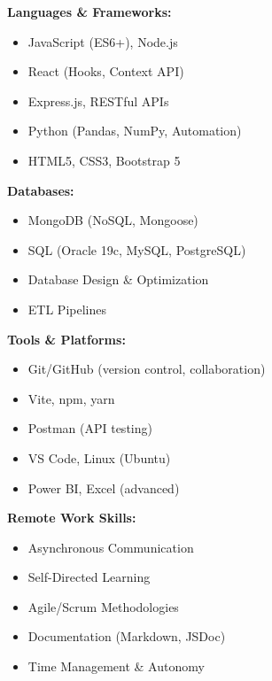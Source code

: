 \documentclass[10pt,letterpaper]{article}
\begin{document}
\vspace{0.4cm}

\vspace{0.3cm}

\noindent
\begin{minipage}[t]{0.48\textwidth}
\textbf{Languages \& Frameworks:}
\begin{itemize}
    \item JavaScript (ES6+), Node.js
    \item React (Hooks, Context API)
    \item Express.js, RESTful APIs
    \item Python (Pandas, NumPy, Automation)
    \item HTML5, CSS3, Bootstrap 5
\end{itemize}

\vspace{0.2cm}

\textbf{Databases:}
\begin{itemize}
    \item MongoDB (NoSQL, Mongoose)
    \item SQL (Oracle 19c, MySQL, PostgreSQL)
    \item Database Design \& Optimization
    \item ETL Pipelines
\end{itemize}
\end{minipage}
\hfill
\begin{minipage}[t]{0.48\textwidth}
\textbf{Tools \& Platforms:}
\begin{itemize}
    \item Git/GitHub (version control, collaboration)
    \item Vite, npm, yarn
    \item Postman (API testing)
    \item VS Code, Linux (Ubuntu)
    \item Power BI, Excel (advanced)
\end{itemize}

\vspace{0.2cm}

\textbf{Remote Work Skills:}
\begin{itemize}
    \item Asynchronous Communication
    \item Self-Directed Learning
    \item Agile/Scrum Methodologies
    \item Documentation (Markdown, JSDoc)
    \item Time Management \& Autonomy
\end{itemize}
\end{minipage}
\end{document}
